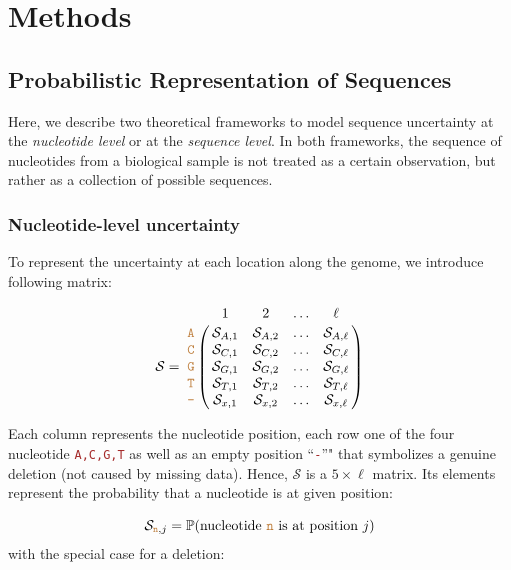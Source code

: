 \documentclass[
]{article}
\newcommand{\sq}[1]{\texttt{\textcolor{brown}{#1}}}
\newcommand{\nps}{\mathcal{S}} %
\newcommand{\pr}[1]{\mathbb{P}(#1)}
\begin{document}
\hypertarget{methods}{%
\section{Methods}\label{methods}}

\hypertarget{probabilistic-representation-of-sequences}{%
\subsection{Probabilistic Representation of
Sequences}\label{probabilistic-representation-of-sequences}}

Here, we describe two theoretical frameworks to model sequence
uncertainty at the \emph{nucleotide level} or at the
\emph{sequence level}. In both frameworks, the sequence of nucleotides
from a biological sample is not treated as a certain observation, but
rather as a collection of possible sequences.

\hypertarget{nucleotide-level-uncertainty}{%
\subsubsection{Nucleotide-level
uncertainty}\label{nucleotide-level-uncertainty}}

To represent the uncertainty at each location along the genome, we
introduce following matrix:

\begin{equation}
\nps = \bordermatrix{   & 1 & 2 & \ldots & \ell \cr
                \sq{A} & \nps_{A, 1} & \nps_{A, 2} & \ldots & \nps_{A, \ell} \cr
                \sq{C} & \nps_{C, 1} & \nps_{C, 2} & \ldots & \nps_{C, \ell} \cr
                \sq{G} & \nps_{G, 1} & \nps_{G, 2} & \ldots & \nps_{G, \ell} \cr
                \sq{T} & \nps_{T, 1} & \nps_{T, 2} & \ldots & \nps_{T, \ell} \cr 
                \sq{-} & \nps_{x, 1} & \nps_{x, 2} & \ldots & \nps_{x, \ell} \cr 
}\label{eq:nps}
\end{equation}

Each column represents the nucleotide position, each row one of the four
nucleotide \sq{A,C,G,T} as well as an empty position ``\sq{-}''" that
symbolizes a genuine deletion (not caused by missing data). Hence,
\(\nps\) is a \(5\times\ell\) matrix. Its elements represent the
probability that a nucleotide is at given position:

\begin{equation}
\nps_{\sq{n},j} = \pr{\text{nucleotide \sq{n} is at position }j}
\end{equation} with the special case for a deletion:
\end{document}
